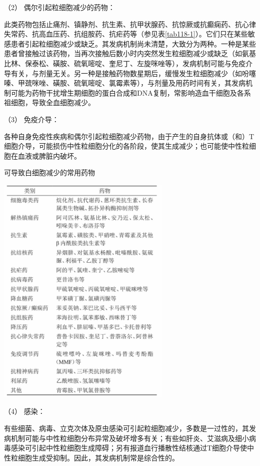 \hypertarget{text00336.htmlux5cux23CHP12-2-1-1-1-2}{}
（2） 偶尔引起粒细胞减少的药物：

此类药物包括止痛剂、镇静剂、抗生素、抗甲状腺药、抗惊厥或抗癫痫药、抗心律失常药、抗高血压药、抗组胺药、抗疟药等（参见表\ref{tab118-1}）。它们只在某些敏感患者引起粒细胞减少或缺乏。其发病机制尚未清楚，大致分为两种。一种是某些患者曾接触过该药物，当再次接触后数小时内突然发生粒细胞减少或缺乏（如氨基比林、保泰松、磺胺、硫氧嘧啶、奎尼丁、左旋咪唑等），发病机制可能与免疫介导有关，与剂量无关。另一种是接触药物数星期后，缓慢发生粒细胞减少（如吩噻嗪、甲巯咪唑、磺胺、硫氧嘧啶、氯霉素等），与剂量及用药时间有关，其发病机制可能为药物干扰增生期细胞的蛋白合成和DNA复制，常影响造血干细胞及各系祖细胞，导致全血细胞减少。

\hypertarget{text00336.htmlux5cux23CHP12-2-1-1-1-3}{}
（3） 免疫介导：

各种自身免疫性疾病和偶尔引起粒细胞减少药物，由于产生的自身抗体或（和）T细胞介导，可能损伤中性粒细胞分化的各阶段，使其生成减少；也可能使中性粒细胞在血液或脾脏内破坏。

\begin{table}[htbp]
\centering
\caption{可导致白细胞减少的常用药物}
\label{tab118-1}
\includegraphics[width=3.29167in,height=4.42708in]{./images/Image00495.jpg}
\end{table}

\hypertarget{text00336.htmlux5cux23CHP12-2-1-1-1-4}{}
（4） 感染：

有些细菌、病毒、立克次体及原虫感染可引起粒细胞减少，多数是一过性的，其发病机制可能与中性粒细胞分布异常及破坏增多有关；有些如肝炎、艾滋病及细小病毒感染可引起中性粒细胞生成障碍；另有报道血行播散性结核通过T细胞介导使中性粒细胞生成受抑制。因此，其发病机制常是综合性的。

